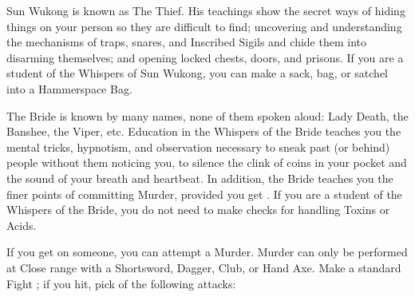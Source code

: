 {    Sun Wukong is known as The Thief.  His teachings show the secret ways of hiding things on your person so they are difficult to find; uncovering and understanding the mechanisms of traps, snares, and Inscribed Sigils and chide them into disarming themselves; and opening locked chests, doors, and prisons.  If you are a student of the Whispers of Sun Wukong, you can make a sack, bag, or satchel into a Hammerspace Bag.




    The Bride is known by many names, none of them spoken aloud:  Lady Death, the Banshee, the Viper, etc.  Education in the Whispers of the Bride teaches you the mental tricks, hypnotism, and observation necessary to sneak past (or behind) people without them noticing you, to silence the clink of coins in your pocket and the sound of your breath and heartbeat. In addition, the Bride teaches you the finer points of committing Murder, provided you get  . If you are a student of the Whispers of the Bride, you do not need to make \DEX checks for handling Toxins or Acids.

    \cbreak


    If you get  on someone, you can attempt a Murder.  Murder can only be performed at Close range with a Shortsword, Dagger, Club, or Hand Axe.  Make a standard Fight \RO; if you hit, pick  of the following attacks:


}
